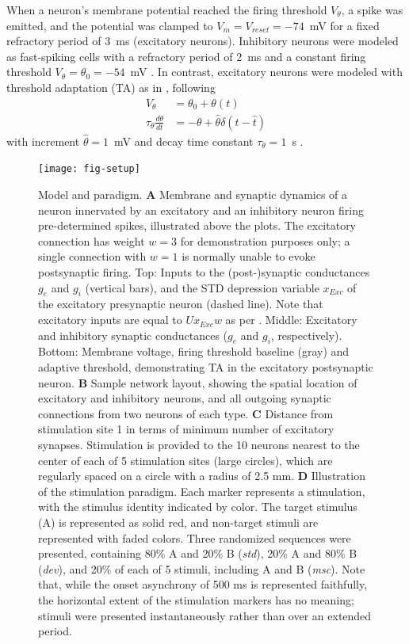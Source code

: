 \documentclass[9pt,lineno,onehalfspacing]{elife}
\newcommand{\dev}{\textit{dev}}
\newcommand{\msc}{\textit{msc}}
\newcommand{\std}{\textit{std}}
\begin{document}
When a neuron's membrane potential reached the firing threshold $V_\theta$, a spike was emitted, and the potential was clamped to $V_m = V_{reset} = -74$~mV for a fixed refractory period of 3~ms (excitatory neurons). Inhibitory neurons were modeled as fast-spiking cells with a refractory period of 2~ms and a constant firing threshold $V_\theta = \theta_0 = -54$~mV \citep{Mensi2012-au}. In contrast, excitatory neurons were modeled with threshold adaptation (TA) as in \cite{Teeter2018-iz}, following
\begin{align}
    V_\theta &= \theta_0 + \theta(t) \nonumber \\
    \tau_{\theta} \frac{d\theta}{dt} &= -\theta + \hat{\theta} \delta(t - \hat{t}) \label{eq:TA}
\end{align}
with increment $\hat{\theta} = 1$~mV and decay time constant $\tau_{\theta} = 1$~s \citep{Henze2001-xd, Pozzorini2015-ei}.

\begin{figure}
    \texttt{[image: fig-setup]}
    \caption{%
        Model and paradigm.
        \textbf{A} Membrane and synaptic dynamics of a neuron innervated by an excitatory and an inhibitory neuron firing pre-determined spikes, illustrated above the plots. The excitatory connection has weight $w = 3$ for demonstration purposes only; a single connection with $w = 1$ is normally unable to evoke postsynaptic firing. Top: Inputs to the (post-)synaptic conductances $g_e$ and $g_i$ (vertical bars), and the STD depression variable $x_{Exc}$ of the excitatory presynaptic neuron (dashed line). Note that excitatory inputs are equal to $U x_{Exc} w$ as per . Middle: Excitatory and inhibitory synaptic conductances ($g_e$ and $g_i$, respectively). Bottom: Membrane voltage, firing threshold baseline (gray) and adaptive threshold, demonstrating TA in the excitatory postsynaptic neuron.
        \textbf{B} Sample network layout, showing the spatial location of excitatory and inhibitory neurons, and all outgoing synaptic connections from two neurons of each type.
        \textbf{C} Distance from stimulation site 1 in terms of minimum number of excitatory synapses. Stimulation is provided to the 10 neurons nearest to the center of each of 5 stimulation sites (large circles), which are regularly spaced on a circle with a radius of 2.5 mm.
        \textbf{D} Illustration of the stimulation paradigm. Each marker represents a stimulation, with the stimulus identity indicated by color. The target stimulus (A) is represented as solid red, and non-target stimuli are represented with faded colors. Three randomized sequences were presented, containing 80\% A and 20\% B (\std{}), 20\% A and 80\% B (\dev{}), and 20\% of each of 5 stimuli, including A and B (\msc{}). Note that, while the onset asynchrony of 500 ms is represented faithfully, the horizontal extent of the stimulation markers has no meaning; stimuli were presented instantaneously rather than over an extended period.
    }
    \label{fig:setup}
\end{figure}
\end{document}
